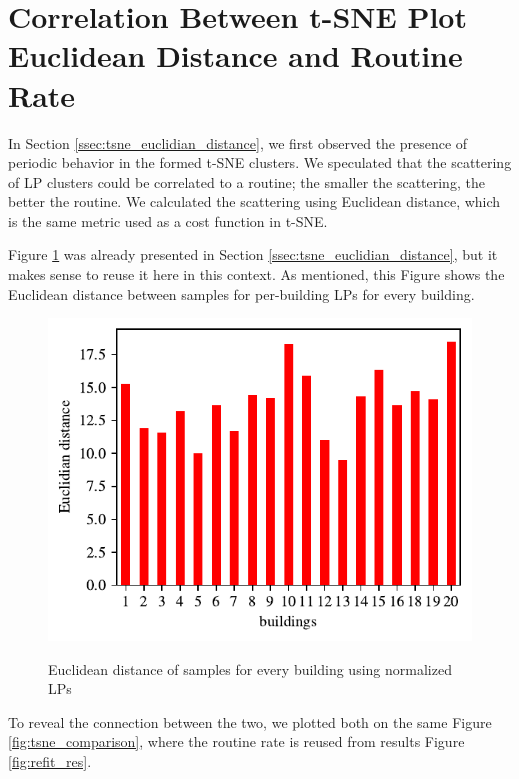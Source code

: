 \section{Correlation Between t-SNE Plot Euclidean Distance and Routine Rate}
\label{sec:tsne_ec_corr}

In Section \ref{ssec:tsne_euclidian_distance}, we first observed the presence of periodic behavior in the formed t-SNE clusters.
We speculated that the scattering of LP clusters could be correlated to a routine; the smaller the scattering, the better the routine.
We calculated the scattering using Euclidean distance, which is the same metric used as a cost function in t-SNE.

Figure \ref{fig:tsne_euclidian2} was already presented in Section \ref{ssec:tsne_euclidian_distance},
but it makes sense to reuse it here in this context.
As mentioned, this Figure shows the Euclidean distance between samples for per-building LPs for every building.

\begin{figure}[H]
	\centering
	\caption{Euclidean distance of samples for every building using normalized LPs}
	\includegraphics[]{Figures/EC/CORR_TSNE/tnse_euclidian.pdf}
	\label{fig:tsne_euclidian2}
\end{figure}

To reveal the connection between the two, we plotted both on the same Figure \ref{fig:tsne_comparison}, where the routine rate is reused from results Figure \ref{fig:refit_res}.

